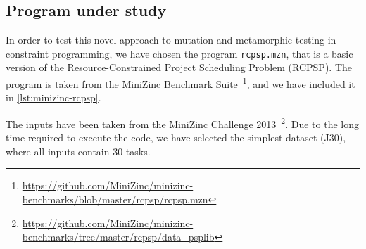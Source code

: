 \subsection{Program under study}
In order to test this novel approach to mutation and metamorphic
testing in constraint programming, we have chosen the program
\lstinline|rcpsp.mzn|, that is a basic version of
the Resource-Constrained Project Scheduling Problem (RCPSP). The
program is taken from the MiniZinc Benchmark
Suite~\footnote{\url{https://github.com/MiniZinc/minizinc-benchmarks/blob/master/rcpsp/rcpsp.mzn}},
and we have included it in \ref{lst:minizinc-rcpsp}.

The inputs have been taken from the MiniZinc Challenge
2013~\footnote{\url{https://github.com/MiniZinc/minizinc-benchmarks/tree/master/rcpsp/data_psplib}}. Due
to the long time required to execute the code, we have selected the simplest
dataset (J30), where all inputs contain 30 tasks.

